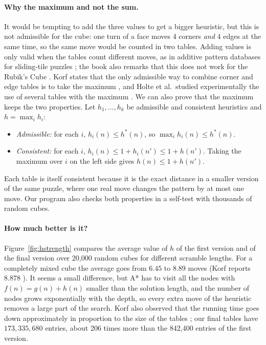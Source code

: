 \paragraph{Why the maximum and not the sum.} It would be tempting to add the three values to get a bigger heuristic, but this is not admissible for the cube: one turn of a face moves 4 corners \emph{and} 4 edges at the same time, so the same move would be counted in two tables. Adding values is only valid when the tables count different moves, as in additive pattern databases for sliding-tile puzzles \cite{felner2004}; the book also remarks that this does not work for the Rubik's Cube \cite[p.~107]{aima3}. Korf states that the only admissible way to combine corner and edge tables is to take the maximum \cite{korf1997}, and Holte et al.\ studied experimentally the use of several tables with the maximum \cite{holte2006}. We can also prove that the maximum keeps the two properties. Let $h_1, \dots, h_k$ be admissible and consistent heuristics and $h = \max_i h_i$:
\begin{itemize}
    \item \textit{Admissible:} for each $i$, $h_i(n) \le h^{*}(n)$, so $\max_i h_i(n) \le h^{*}(n)$.
    \item \textit{Consistent:} for each $i$, $h_i(n) \le 1 + h_i(n') \le 1 + h(n')$. Taking the maximum over $i$ on the left side gives $h(n) \le 1 + h(n')$.
\end{itemize}
Each table is itself consistent because it is the exact distance in a smaller version of the same puzzle, where one real move changes the pattern by at most one move. Our program also checks both properties in a self-test with thousands of random cubes.

\paragraph{How much better is it?} Figure~\ref{fig:hstrength} compares the average value of $h$ of the first version and of the final version over 20,000 random cubes for different scramble lengths. For a completely mixed cube the average goes from $6.45$ to $8.89$ moves (Korf reports $8.878$ \cite{korf1997}). It seems a small difference, but A* has to visit all the nodes with $f(n) = g(n) + h(n)$ smaller than the solution length, and the number of nodes grows exponentially with the depth, so every extra move of the heuristic removes a large part of the search. Korf also observed that the running time goes down approximately in proportion to the size of the tables \cite{korf1997}; our final tables have $173{,}335{,}680$ entries, about 206 times more than the 842,400 entries of the first version.

